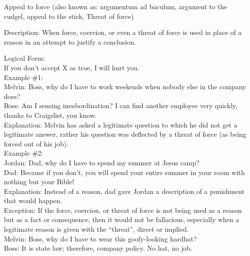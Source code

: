 \documentclass[a4paper,12pt,single,pdftex]{scrartcl}
\begin{document}
Appeal to force
    (also known as: argumentum ad baculum, argument to the cudgel, appeal to the stick, Threat of force)
  
    Description:  When force, coercion, or even a threat of force is used in place of a reason in an attempt to justify a conclusion.

    
      Logical Form:
    \\

    
      If you don’t accept X as true, I will hurt you.
    \\

    
      Example \#1:
    \\

    
      Melvin: Boss, why do I have to work weekends when nobody else in the company does?
    \\

    
      Boss: Am I sensing insubordination?  I can find another employee very quickly, thanks to Craigslist, you know.
    \\

    
      Explanation: Melvin has asked a legitimate question to which he did not get a legitimate answer, rather his question was deflected by a threat of force (as being forced out of his job).
    \\

    
      Example \#2:
    \\

    
      Jordan: Dad, why do I have to spend my summer at Jesus camp?
    \\

    
      Dad: Because if you don’t, you will spend your entire summer in your room with nothing but your Bible!
    \\

    
      Explanation: Instead of a reason, dad gave Jordan a description of a punishment that would happen.
    \\

    
      Exception:  If the force, coercion, or threat of force is not being used as a reason but as a fact or consequence, then it would not be fallacious, especially when a legitimate reason is given with the “threat”, direct or implied. 
    \\

    
      Melvin: Boss, why do I have to wear this goofy-looking hardhat?
    \\

    
      Boss: It is state law; therefore, company policy.  No hat, no job.
    \\
\end{document}
